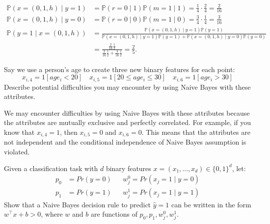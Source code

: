 \documentclass{article}
\renewcommand{\P}{\mathbb{P}}
\begin{document}
\begin{probset}
\begin{prob}
\begin{subprobset}
\begin{subprob}
            \begin{soln}
                \begin{align*}
                    \P(x=(0,1,h)\mid y=1) &= \P(r=0\mid1)\P(m=1\mid1) = \frac14 \cdot \frac24 = \frac{2}{16} \\
                    \P(x=(0,1,h)\mid y=0) &= \P(r=0\mid0)\P(m=1\mid0) = \frac34 \cdot \frac14 = \frac{3}{16} \\
                    \P(y=1\mid x = (0,1,h)) &= \frac{\P(x=(0,1,h)\mid y=1)\P(y=1)}{\P(x=(0,1,h)\mid y=1)\P(y=1) + \P(x=(0,1,h)\mid y=0)\P(y=0)} \\
                    &= \frac{\frac{2}{16}\frac{1}{2}}{\frac{2}{16}\frac{1}{2} + \frac{3}{16}\frac{1}{2}} = \frac25.
                \end{align*}
            \end{soln}
        \end{subprob}

        \begin{subprob}
            Say we use a person's age to create three new binary features for each point:
            \[
            x_{i,4} = 1[age_i < 20] \quad
            x_{i,5} = 1[20 \leq age_i \leq 30] \quad
            x_{i,6} = 1[age_i > 30]
            \]
            Describe potential difficulties you may encounter by using Naive Bayes with these attributes.

            \begin{soln}
                We may encounter difficulties by using Naive Bayes with these attributes because the attributes are mutually exclusive and perfectly correlated. For example, if you know that $x_{i,4} = 1$, then $x_{i,5} = 0$ and $x_{i,6} = 0$. This means that the attributes are not independent and the conditional independence of Naive Bayes assumption is violated.
            \end{soln}
        \end{subprob}

        \begin{subprob}
            Given a classification task with $d$ binary features $x = (x_1, \ldots, x_d) \in \{0, 1\}^d$, let:
            \begin{align*}
                p_0 &= Pr(y = 0) &&
                w^0_j = Pr(x_j = 1 \mid y = 0) \\
                p_1 &= Pr(y = 1) &&
                w^1_j = Pr(x_j = 1 \mid y = 1)
            \end{align*}
            Show that a Naive Bayes decision rule to predict $\hat{y} = 1$ can be written in the form $w^\top x + b > 0$,
            where $w$ and $b$ are functions of $p_0, p_1, w^0_j, w^1_j$.


\end{subprob}
\end{subprobset}
\end{prob}
\end{probset}
\end{document}
